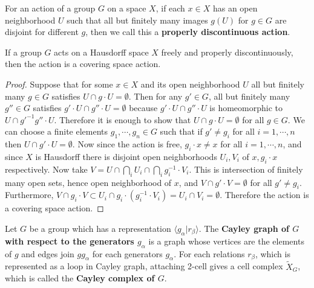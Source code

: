 \begin{defn} For an action of a group $G$ on a space $X$, if each $x\in X$ has an open neighborhood $U$ such that all but finitely many images $g(U)$ for $g\in G$ are disjoint for different $g$, then we call this a \textbf{properly discontinuous action}.
\end{defn}
\begin{prop} If a group $G$ acts on a Hausdorff space $X$ freely and properly discontinuously, then the action is a covering space action.
\end{prop}
\begin{proof} Suppose that for some $x\in X$ and its open neighborhood $U$ all but finitely many $g\in G$ satisfies $U\cap g\cdot U=\emptyset$. Then for any $g'\in G$, all but finitely many $g''\in G$ satisfies $g'\cdot U\cap g''\cdot U=\emptyset$ because $g'\cdot U\cap g''\cdot U$ is homeomorphic to $U\cap g'^{-1}g''\cdot U$. Therefore it is enough to show that $U\cap g\cdot U=\emptyset$ for all $g\in G$. We can choose a finite elements $g_1,\cdots,g_n\in G$ such that if $g'\neq g_i$ for all $i=1,\cdots, n$ then $U\cap g'\cdot U=\emptyset$. Now since the action is free, $g_i\cdot x\neq x$ for all $i=1,\cdots,n$, and since $X$ is Hausdorff there is disjoint open neighborhoods $U_i,V_i$ of $x,g_i\cdot x$ respectively. Now take $V=U\cap \bigcap_i U_i \cap \bigcap_i g_i^{-1}\cdot V_i$. This is intersection of finitely many open sets, hence open neighborhood of $x$, and $V\cap g'\cdot V=\emptyset$ for all $g'\neq g_i$. Furthermore, $V\cap g_i\cdot V\subset U_i\cap g_i\cdot(g_i^{-1}\cdot V_i)=U_i\cap V_i=\emptyset$. Therefore the action is a covering space action.
\end{proof}
\begin{defn} Let $G$ be a group which has a representation $\langle g_\alpha|r_\beta\rangle$. The \textbf{Cayley graph of $G$ with respect to the generators $g_\alpha$} is a graph whose vertices are the elements of $g$ and edges join $gg_\alpha$ for each generators $g_\alpha$. For each relations $r_\beta$, which is represented as a loop in Cayley graph, attaching 2-cell gives a cell complex $\tilde{X}_G$, which is called the \textbf{Cayley complex of $G$}.
\end{defn}
